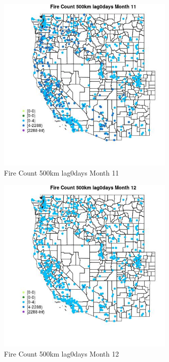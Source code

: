 \begin{figure} 
\centering  
\includegraphics[width=0.77\textwidth]{Code_Outputs/Report_ML_input_PM25_Step4_part_e_de_duplicated_aves_compiled_2019-05-21wNAs_MapObsMo11Fire_Count_500km_lag0days.jpg} 
\caption{\label{fig:Report_ML_input_PM25_Step4_part_e_de_duplicated_aves_compiled_2019-05-21wNAsMapObsMo11Fire_Count_500km_lag0days}Fire Count 500km lag0days Month 11} 
\end{figure} 
 

\clearpage 

\begin{figure} 
\centering  
\includegraphics[width=0.77\textwidth]{Code_Outputs/Report_ML_input_PM25_Step4_part_e_de_duplicated_aves_compiled_2019-05-21wNAs_MapObsMo12Fire_Count_500km_lag0days.jpg} 
\caption{\label{fig:Report_ML_input_PM25_Step4_part_e_de_duplicated_aves_compiled_2019-05-21wNAsMapObsMo12Fire_Count_500km_lag0days}Fire Count 500km lag0days Month 12} 
\end{figure} 
 

